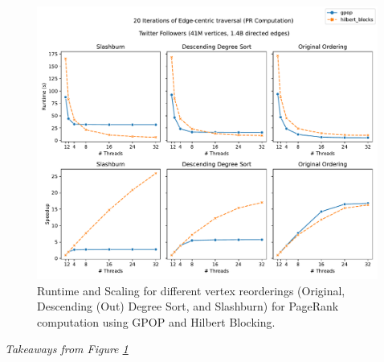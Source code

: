     \newpage
    \begin{figure}[!htb]
    \centering
    \includegraphics[width=5in]{../plots/eval/twitter_gpop_illustrative.pdf}
    \caption{Runtime and Scaling for different vertex reorderings (Original, Descending (Out) Degree Sort, and  Slashburn) for PageRank computation using GPOP and Hilbert Blocking.}
    \label{fig:fig-twitter-comp-illustration}   %
    \end{figure}
    
    \textit{Takeaways from Figure \ref{fig:fig-twitter-comp-illustration}}


